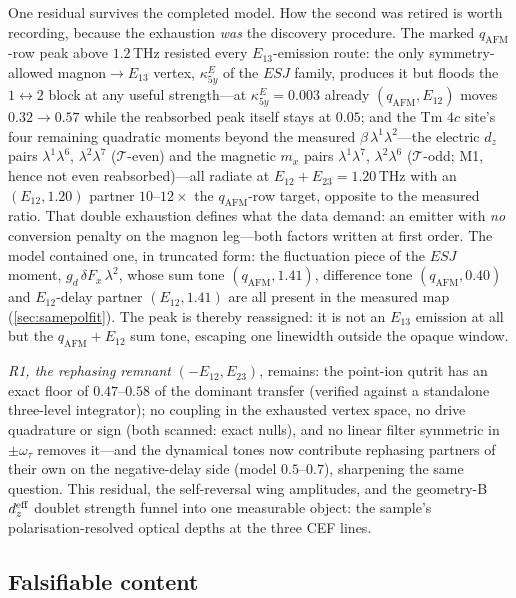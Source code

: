 \documentclass[11pt,a4paper]{article}
\newcommand{\qafm}{q_{\mathrm{AFM}}}
\begin{document}
One residual survives the completed model.  How the second was
retired is worth recording, because the exhaustion \emph{was} the
discovery procedure.  The marked $\qafm$-row peak above $1.2$\,THz
resisted every $E_{13}$-emission route: the only symmetry-allowed
magnon$\to$$E_{13}$ vertex, $\kappa^E_{5y}$ of the $ESJ$ family,
produces it but floods the $1\!\leftrightarrow\!2$ block at any useful
strength---at $\kappa^E_{5y}=0.003$ already $(\qafm,E_{12})$ moves
$0.32\to0.57$ while the reabsorbed peak itself stays at $0.05$; and
the Tm $4c$ site's four remaining quadratic moments beyond the
measured $\beta\,\lambda^1\lambda^2$---the electric $d_z$ pairs
$\lambda^1\lambda^6$, $\lambda^2\lambda^7$ ($\mathcal T$-even) and the
magnetic $m_x$ pairs $\lambda^1\lambda^7$, $\lambda^2\lambda^6$
($\mathcal T$-odd; M1, hence not even reabsorbed)---all radiate at
$E_{12}+E_{23}=1.20$\,THz with an $(E_{12},1.20)$ partner
$10$--$12\times$ the $\qafm$-row target, opposite to the measured
ratio.  That double exhaustion defines what the data demand: an
emitter with \emph{no} conversion penalty on the magnon leg---both
factors written at first order.  The model contained one, in truncated
form: the fluctuation piece of the $ESJ$ moment,
$g_d\,\delta F_x\,\lambda^2$, whose sum tone $(\qafm,1.41)$,
difference tone $(\qafm,0.40)$ and $E_{12}$-delay partner
$(E_{12},1.41)$ are all present in the measured map
(\cref{sec:samepolfit}).  The peak is thereby reassigned: it is not an
$E_{13}$ emission at all but the $\qafm{+}E_{12}$ sum tone, escaping
one linewidth outside the opaque window.

\emph{R1, the rephasing remnant} $(-E_{12},E_{23})$, remains: the
point-ion qutrit has an exact floor of $0.47$--$0.58$ of the dominant
transfer (verified against a standalone three-level integrator); no
coupling in the exhausted vertex space, no drive quadrature or sign
(both scanned: exact nulls), and no linear filter symmetric in
$\pm\omega_\tau$ removes it---and the dynamical tones now contribute
rephasing partners of their own on the negative-delay side (model
$0.5$--$0.7$), sharpening the same question.  This residual, the
self-reversal wing amplitudes, and the geometry-B
$d_z^{\rm eff}$ doublet strength funnel into one measurable object: the
sample's polarisation-resolved optical depths at the three CEF lines.

\subsection{Falsifiable content}
\label{sec:predictions2}
\end{document}

